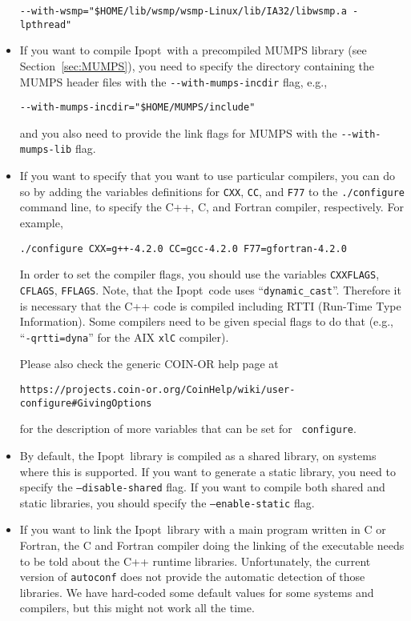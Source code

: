 \documentclass[10pt]{article}
\newcommand{\Ipopt}{{\sc Ipopt}}
\begin{document}
\begin{itemize}
  \verb|--with-wsmp="$HOME/lib/wsmp/wsmp-Linux/lib/IA32/libwsmp.a -lpthread"|

\item If you want to compile \Ipopt\ with a precompiled MUMPS library
  (see Section~\ref{sec:MUMPS}), you need to specify the directory containing
  the MUMPS header files with the \verb|--with-mumps-incdir| flag,
  e.g.,

  \verb|--with-mumps-incdir="$HOME/MUMPS/include"|

  and you also need to provide the link flags for MUMPS with the
  \verb|--with-mumps-lib| flag.

\item If you want to specify that you want to use particular
  compilers, you can do so by adding the variables definitions for
  {\tt CXX}, {\tt CC}, and {\tt F77} to the {\tt ./configure} command
  line, to specify the C++, C, and Fortran compiler, respectively.
  For example,

  {\tt ./configure CXX=g++-4.2.0 CC=gcc-4.2.0 F77=gfortran-4.2.0}

  In order to set the compiler flags, you should use the variables
  {\tt CXXFLAGS}, {\tt CFLAGS}, {\tt FFLAGS}.  Note, that the \Ipopt\
  code uses ``{\tt dynamic\_cast}''.  Therefore it is necessary that
  the C++ code is compiled including RTTI (Run-Time Type Information).
  Some compilers need to be given special flags to do that (e.g.,
  ``{\tt -qrtti=dyna}'' for the AIX {\tt xlC} compiler).

  Please also check the generic COIN-OR help page at

  \centerline{\tt https://projects.coin-or.org/CoinHelp/wiki/user-configure\#GivingOptions}

  for the description of more variables that can be set for {\tt
    configure}.

\item By default, the \Ipopt\ library is compiled as a shared library,
  on systems where this is supported.  If you want to generate a
  static library, you need to specify the {\tt --disable-shared}
  flag.  If you want to compile both shared and static libraries, you
  should specify the {\tt --enable-static} flag.

\item If you want to link the \Ipopt\ library with a main program
  written in C or Fortran, the C and Fortran compiler doing the
  linking of the executable needs to be told about the C++ runtime
  libraries.  Unfortunately, the current version of {\tt autoconf}
  does not provide the automatic detection of those libraries.  We
  have hard-coded some default values for some systems and compilers,
  but this might not work all the time.


\end{itemize}
\end{document}
